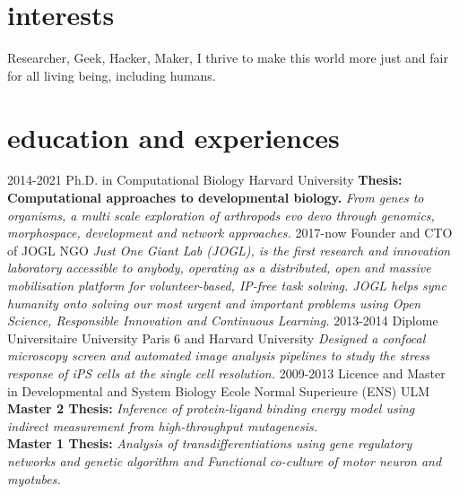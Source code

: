 \documentclass[]{twentysecondcv}
\begin{document}


\makeprofile


\section{interests}
Researcher, Geek, Hacker, Maker, I thrive to make this world more just and fair for all living being, including humans.

\section{education and experiences}

\begin{twenty}
  \twentyitem
    {2014-2021}
    {Ph.D. {\normalfont in Computational Biology}}
    {Harvard University}
    {\textbf{Thesis:} \textbf{Computational approaches to developmental biology.} \emph{From genes to organisms, a multi scale exploration of arthropods evo devo through genomics, morphospace, development and network approaches.}}
  \twentyitem
    {2017-now}
    {Founder and CTO of JOGL}
    {NGO}
    {\emph{Just One Giant Lab (JOGL), is the first research and innovation laboratory accessible to anybody, operating as a distributed, open and massive mobilisation platform for volunteer-based, IP-free task solving. JOGL helps sync humanity onto solving our most urgent and important problems using Open Science, Responsible Innovation and Continuous Learning.}}
  \twentyitem
    {2013-2014}
    {Diplome Universitaire}
    {University Paris 6 and Harvard University}
    {\emph{Designed a confocal microscopy screen and automated image analysis pipelines to study the stress response of iPS cells at the single cell resolution.}}
  \twentyitem
    {2009-2013}
    {Licence and Master in Developmental and System Biology}
    {Ecole Normal Superieure (ENS) ULM}
    {\textbf{Master 2 Thesis:} \emph{Inference of protein-ligand binding energy model using indirect measurement from high-throughput mutagenesis.} \\ 
     \textbf{Master 1 Thesis:} \emph{Analysis of transdifferentiations using gene regulatory networks and genetic algorithm and Functional co-culture of motor neuron and myotubes.}}



\end{twenty}
\end{document}
